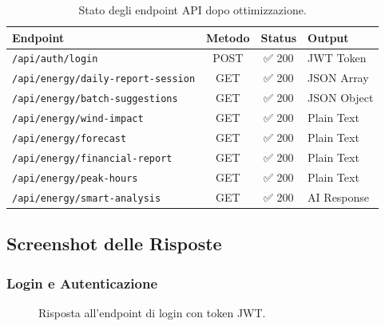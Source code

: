\documentclass[a4paper,12pt]{report}
\begin{document}
\begin{table}[H]
    \centering
    \begin{tabular}{lccl}
        \toprule
        \textbf{Endpoint} & \textbf{Metodo} & \textbf{Status} & \textbf{Output} \\
        \midrule
        \texttt{/api/auth/login} & POST & ✅ 200 & JWT Token \\
        \texttt{/api/energy/daily-report-session} & GET & ✅ 200 & JSON Array \\
        \texttt{/api/energy/batch-suggestions} & GET & ✅ 200 & JSON Object \\
        \texttt{/api/energy/wind-impact} & GET & ✅ 200 & Plain Text \\
        \texttt{/api/energy/forecast} & GET & ✅ 200 & Plain Text \\
        \texttt{/api/energy/financial-report} & GET & ✅ 200 & Plain Text \\
        \texttt{/api/energy/peak-hours} & GET & ✅ 200 & Plain Text \\
        \texttt{/api/energy/smart-analysis} & GET & ✅ 200 & AI Response \\
        \bottomrule
    \end{tabular}
    \caption{Stato degli endpoint API dopo ottimizzazione.}
    \label{tbl:endpoints}
\end{table}

\subsection{Screenshot delle Risposte}

\subsubsection{Login e Autenticazione}
\begin{figure}[H]
    \centering
    \caption{Risposta all'endpoint di login con token JWT.}
    \label{fig:screenshot_login}
\end{figure}
\end{document}
